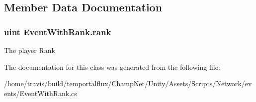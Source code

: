 \subsection{Member Data Documentation}
\hypertarget{class_event_with_rank_ab7a5557f1fe949d90945003b566d33db}{
\subsubsection[{rank}]{\setlength{\rightskip}{0pt plus 5cm}uint Event\-With\-Rank.\-rank}}\label{class_event_with_rank_ab7a5557f1fe949d90945003b566d33db}


The player Rank 



The documentation for this class was generated from the following file\-:\begin{DoxyCompactItemize}
\item 
/home/travis/build/temportalflux/\-Champ\-Net/\-Unity/\-Assets/\-Scripts/\-Network/events/Event\-With\-Rank.\-cs\end{DoxyCompactItemize}
